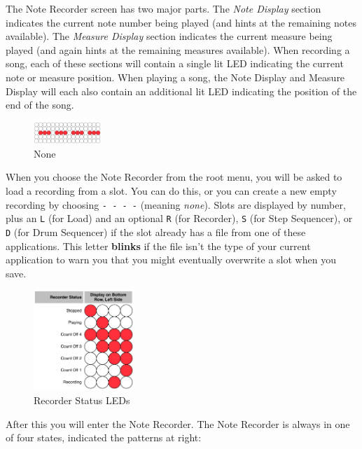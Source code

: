\documentclass{article}
\begin{document}
The Note Recorder screen has two major parts.  The {\it Note Display} section indicates the current note number being played (and hints at the remaining notes available).  The {\it Measure Display} section indicates the current measure being played (and again hints at the remaining measures available).  When recording a song, each of these sections will contain a single lit LED indicating the current note or measure position.  When playing a song, the Note Display and Measure Display will each also contain an additional lit LED indicating the position of the end of the song.

\begin{figure}
\includegraphics[width=1in]{none.pdf}
\vspace{-2em}\caption{\small None}\vspace{-1em}
\label{none}
\end{figure}

When you choose the Note Recorder from the root menu, you will be asked to load a recording from a slot.  You can do this, or you can create a new empty recording by choosing \texttt{-~-~-~-} (meaning {\it none}).  Slots are displayed by number, plus an \texttt{L} (for Load) and an optional \texttt{R} (for Recorder), \texttt{S} (for Step Sequencer), or \texttt{D} (for Drum Sequencer) if the slot already has a file from one of these applications.  This letter {\bf blinks} if the file isn't the type of your current application to warn you that you might eventually overwrite a slot when you save.

\begin{figure}
\includegraphics[width=1.5in]{recorderstatus.pdf}
\vspace{-2em}\caption{\small Recorder Status LEDs}\vspace{-4em}
\label{recorderstatus}
\end{figure}

After this you will enter the Note Recorder.  The Note Recorder is always in one of four states, indicated the patterns at right:
\end{document}
